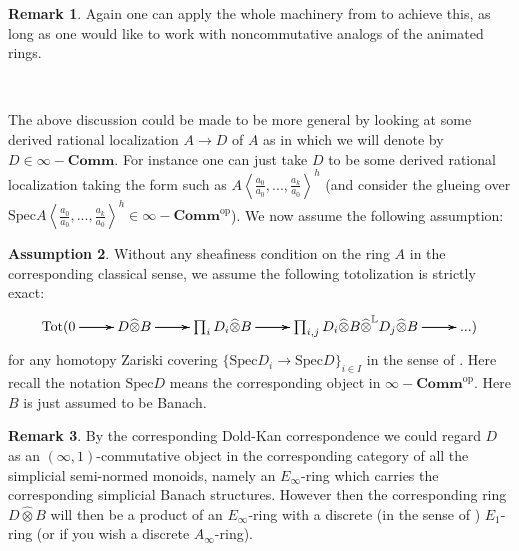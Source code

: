 \documentclass[12pt]{amsart}
\newtheorem{theorem}{Theorem}[section]
\theoremstyle{definition}
\newtheorem{remark}[theorem]{Remark}
\numberwithin{equation}{section}
\newtheorem{assumption}[theorem]{Assumption}
\begin{document}
\begin{remark}
Again one can apply the whole machinery from \cite{CS} to achieve this, as long as one would like to work with noncommutative analogs of the animated rings.	
\end{remark}

\
%
%



\indent The above discussion could be made to be more general by looking at some derived rational localization $A\rightarrow D$ of $A$ as in \cite{BK1} which we will denote by $D\in \infty-\mathbf{Comm}$.  For instance one can just take $D$ to be some derived rational localization taking the form such as $A\left<\frac{a_0}{a_0},...,\frac{a_k}{a_0}\right>^h$ (and consider the glueing over $\mathrm{Spec}A\left<\frac{a_0}{a_0},...,\frac{a_k}{a_0}\right>^h\in \infty-\mathbf{Comm}^\mathrm{op}$). We now assume the following assumption:




\begin{assumption}
Without any sheafiness condition on the ring $A$ in the corresponding classical sense, we assume the following totolization is strictly exact:
\[
\xymatrix@C+0pc@R+0pc{
\mathrm{Tot}(0  \ar[r]\ar[r]\ar[r] &D\widehat{\otimes} B \ar[r]\ar[r]\ar[r] & \prod_i D_i\widehat{\otimes} B \ar[r]\ar[r]\ar[r] &\prod_{i,j} D_i\widehat{\otimes} B \widehat{\otimes}^\mathbb{L} D_j\widehat{\otimes}B\ar[r]\ar[r]\ar[r] &...)
}
\]	
for any homotopy Zariski covering $\{\mathrm{Spec}D_i\rightarrow \mathrm{Spec}D\}_{i\in I}$ in the sense of \cite[Theorem 4.15]{BK1}. Here recall the notation $\mathrm{Spec}D$ means the corresponding object in $\infty-\mathbf{Comm}^\mathrm{op}$. Here $B$ is just assumed to be Banach.
\end{assumption}

\begin{remark}
\indent By the corresponding Dold-Kan correspondence we could regard $D$ as an $(\infty,1)$-commutative object in the corresponding category of all the simplicial semi-normed monoids, namely an $E_\infty$-ring which carries the corresponding simplicial Banach structures. However then the corresponding ring $D\widehat{\otimes}B$ will then be a product of an $E_\infty$-ring with a discrete (in the sense of \cite[Chapter 7.2]{Lu2}) $E_1$-ring (or if you wish a discrete $A_\infty$-ring).
\end{remark}
\end{document}
